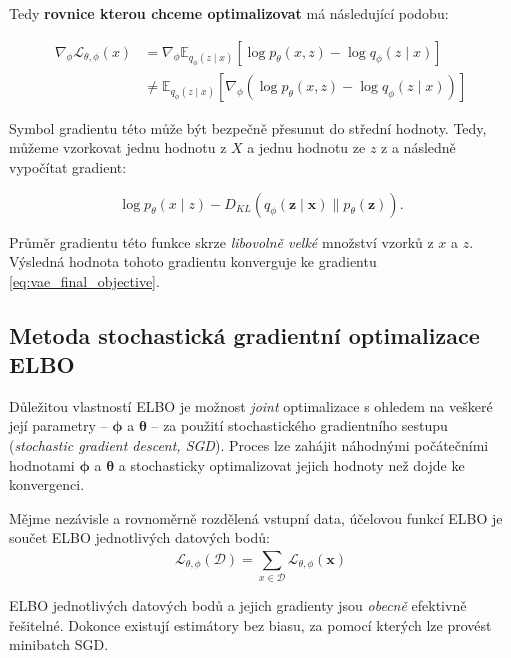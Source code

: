 Tedy \textbf{rovnice kterou chceme optimalizovat} má následující podobu:

\begin{align}
   \nabla_\phi \mathcal{L}_{\theta,\phi}(x) &= \nabla_\phi \mathds{E}_{q_\phi(z\mid x)} \left[ \log p_\theta (x, z) - \log q_\phi (z\mid x) \right] \label{eq:vae_final_objective} \\
                                            &\neq \mathds{E}_{q_\phi(z\mid x)} \left[ \nabla_\phi (\log p_\theta (x, z) - \log q_\phi (z\mid x) ) \right] \label{eq:vae_final_objective_dependent_gradient}
\end{align}

Symbol gradientu této může být bezpečně přesunut do střední hodnoty.
Tedy, můžeme vzorkovat jednu hodnotu z $X$ a jednu hodnotu ze $z$ z a následně vypočítat gradient:

\begin{equation} \label{eq:sample_gradient}
    \log p_\theta(x \mid z) - D_{KL}(q_\phi(\textbf{z}\mid\textbf{x})\parallel p_\theta(\textbf{z})). 
\end{equation}

Průměr gradientu této funkce skrze \emph{libovolně velké} množství vzorků z $x$ a $z$. Výsledná hodnota tohoto gradientu konverguje ke gradientu \autoref{eq:vae_final_objective}.

\subsection{Metoda stochastická gradientní optimalizace ELBO}
Důležitou vlastností ELBO je možnost \emph{joint} optimalizace s ohledem na veškeré její parametry – $\boldsymbol{\phi}$ a $\boldsymbol{\theta}$ – za použití stochastického gradientního sestupu (\emph{stochastic gradient descent, SGD}).
Proces lze zahájit náhodnými počátečními hodnotami $\boldsymbol{\phi}$ a $\boldsymbol{\theta}$ a stochasticky optimalizovat jejich hodnoty než dojde ke konvergenci.

Mějme nezávisle a rovnoměrně rozdělená vstupní data, účelovou funkcí ELBO je součet ELBO jednotlivých datových bodů:
\begin{equation}
    \mathcal{L}_{\theta,\phi}(\mathcal{D}) = \sum_{x\in\mathcal{D}}^{} \mathcal{L}_{\theta,\phi}(\textbf{x})
\end{equation}

ELBO jednotlivých datových bodů a jejich gradienty jsou \emph{obecně} efektivně řešitelné.
Dokonce existují estimátory bez biasu, za pomocí kterých lze provést minibatch SGD.

